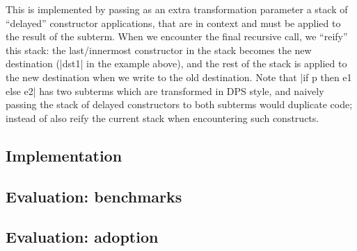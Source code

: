 This is implemented by passing as an extra transformation parameter a stack of ``delayed'' constructor applications, that are in context and must be applied to the result of the subterm. When we encounter the final recursive call, we ``reify'' this stack: the last/innermost constructor in the stack becomes the new destination (\ocaml|dst1| in the example above), and the rest of the stack is applied to the new destination when we write to the old destination. Note that \ocaml|if p then e1 else e2| has two subterms which are transformed in DPS style, and naively passing the stack of delayed constructors to both subterms would duplicate code; instead of also reify the current stack when encountering such constructs.

\subsection{Implementation} 

\subsection{Evaluation: benchmarks}

\subsection{Evaluation: adoption}



